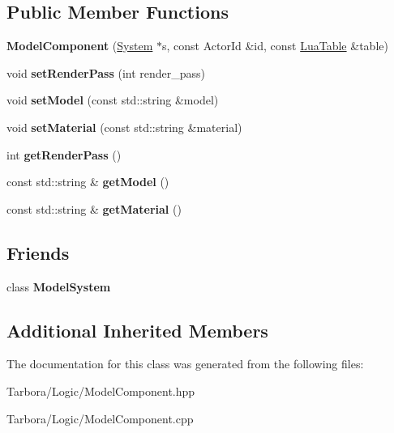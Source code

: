 \subsection*{Public Member Functions}
\begin{DoxyCompactItemize}
\item 
\mbox{\label{classTarbora_1_1ModelComponent_a3c65630afb4f7492991d89e90ff5a58d}} 
{\bfseries Model\+Component} (\hyperlink{classTarbora_1_1System}{System} $\ast$s, const Actor\+Id \&id, const \hyperlink{classTarbora_1_1LuaTable}{Lua\+Table} \&table)
\item 
\mbox{\label{classTarbora_1_1ModelComponent_a8e53127e98624155f27ee99354f0f355}} 
void {\bfseries set\+Render\+Pass} (int render\+\_\+pass)
\item 
\mbox{\label{classTarbora_1_1ModelComponent_a246f4351be1c4dd303bc2623e07f40bf}} 
void {\bfseries set\+Model} (const std\+::string \&model)
\item 
\mbox{\label{classTarbora_1_1ModelComponent_aaa7dc552cad6e0729501eb88de18495e}} 
void {\bfseries set\+Material} (const std\+::string \&material)
\item 
\mbox{\label{classTarbora_1_1ModelComponent_ac4b358020b796b0cd73888f6a5a043d8}} 
int {\bfseries get\+Render\+Pass} ()
\item 
\mbox{\label{classTarbora_1_1ModelComponent_a2c0be08c15bcd5b4afe3faf7a326b18a}} 
const std\+::string \& {\bfseries get\+Model} ()
\item 
\mbox{\label{classTarbora_1_1ModelComponent_aec4698d542d90ef5908b29be125283fc}} 
const std\+::string \& {\bfseries get\+Material} ()
\end{DoxyCompactItemize}
\subsection*{Friends}
\begin{DoxyCompactItemize}
\item 
\mbox{\label{classTarbora_1_1ModelComponent_a7a991f5b81897980348210f2f9f6ad69}} 
class {\bfseries Model\+System}
\end{DoxyCompactItemize}
\subsection*{Additional Inherited Members}


The documentation for this class was generated from the following files\+:\begin{DoxyCompactItemize}
\item 
Tarbora/\+Logic/Model\+Component.\+hpp\item 
Tarbora/\+Logic/Model\+Component.\+cpp\end{DoxyCompactItemize}
